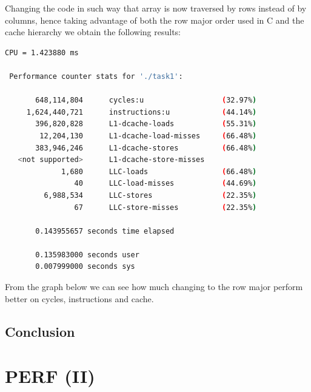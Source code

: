 \documentclass[11pt,a4paper]{article}
\begin{document}
Changing the code in such way that array is now traversed by rows
instead of by columns, hence taking advantage of both the row major order used in C and the cache hierarchy we obtain the following results:
\begin{lstlisting}[language=bash]
CPU = 1.423880 ms 

 Performance counter stats for './task1':

       648,114,804      cycles:u                  (32.97%)
     1,624,440,721      instructions:u            (44.14%)
       396,820,828      L1-dcache-loads           (55.31%)
        12,204,130      L1-dcache-load-misses     (66.48%)
       383,946,246      L1-dcache-stores          (66.48%)
   <not supported>      L1-dcache-store-misses                                      
             1,680      LLC-loads                 (66.48%)
                40      LLC-load-misses           (44.69%)
         6,988,534      LLC-stores                (22.35%)
                67      LLC-store-misses          (22.35%)

       0.143955657 seconds time elapsed

       0.135983000 seconds user
       0.007999000 seconds sys
\end{lstlisting}
From the graph below we can see how much changing to the row major perform better on cycles, instructions and cache. 
\subsection{Conclusion}
\newpage
\section{PERF (II)}
\newpage
\end{document}
